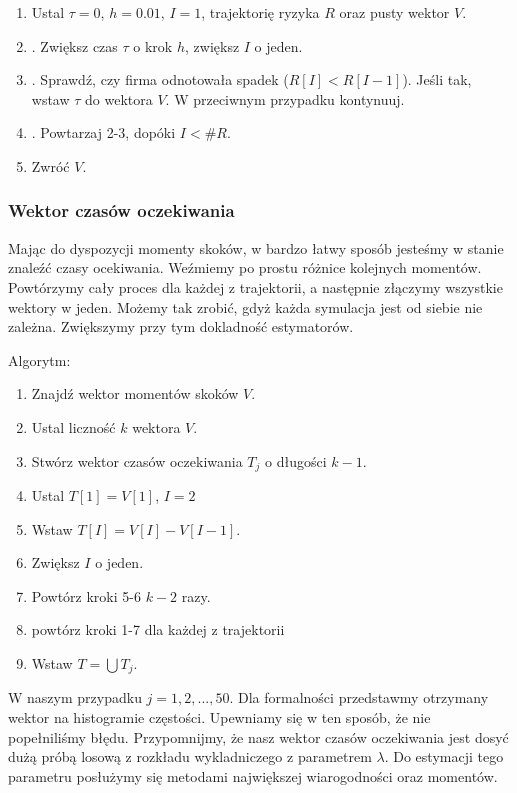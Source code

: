 \documentclass{article}
\theoremstyle{break}
\numberwithin{equation}{subsection}
\numberwithin{figure}{section}
\begin{document}
\begin{enumerate}
\item Ustal $\tau=0$, $h=0.01$, $I = 1$, trajektorię ryzyka $R$ oraz pusty wektor $V.$
\item. Zwiększ czas $\tau$ o krok $h$, zwiększ $I$ o jeden.
\item. Sprawdź, czy firma odnotowała spadek ($R[I] < R[I-1]$). Jeśli tak, wstaw $\tau$ do wektora $V$. W przeciwnym przypadku kontynuuj.
\item. Powtarzaj 2-3, dopóki $I < \#R$.
\item Zwróć $V.$
\end{enumerate}

\subsubsection*{Wektor czasów oczekiwania}

Mając do dyspozycji momenty skoków, w bardzo łatwy sposób jesteśmy w stanie znaleźć czasy ocekiwania. Weźmiemy po prostu różnice kolejnych momentów. Powtórzymy cały proces dla każdej z trajektorii, a następnie złączymy wszystkie wektory w jeden. Możemy tak zrobić, gdyż każda symulacja jest od siebie nie zależna. Zwiększymy przy tym dokladność estymatorów.

Algorytm:

\begin{enumerate}
\item Znajdź wektor momentów skoków $V$.
\item Ustal liczność $k$ wektora $V$.
\item Stwórz wektor czasów oczekiwania $T_j$ o długości $k-1$.
\item Ustal $T[1] = V[1]$, $I=2$
\item Wstaw $T[I] = V[I] - V[I-1]$.
\item Zwiększ $I$ o jeden.
\item Powtórz kroki 5-6 $k-2$ razy.
\item powtórz kroki 1-7 dla każdej z trajektorii
\item Wstaw $T = \bigcup T_j$.
\end{enumerate}

W naszym przypadku $j = 1, 2, ...,50$. Dla formalności przedstawmy otrzymany wektor na histogramie częstości. Upewniamy się w ten sposób, że nie popełniliśmy błędu.
Przypomnijmy, że nasz wektor czasów oczekiwania jest dosyć dużą próbą losową z rozkładu wykladniczego z parametrem $\lambda$. Do estymacji tego parametru posłużymy się metodami największej wiarogodności oraz momentów.
\end{document}
